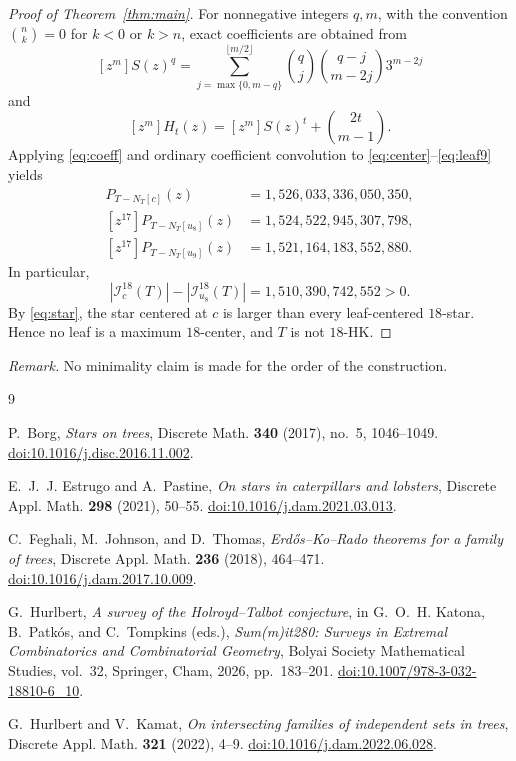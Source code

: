 \documentclass[11pt]{amsart}
\newcommand{\I}{\mathcal I}
\begin{document}
\begin{proof}[Proof of Theorem~\ref{thm:main}]
For nonnegative integers $q,m$, with the convention $\binom{n}{k}=0$ for
$k<0$ or $k>n$, exact coefficients are obtained from
\begin{equation}\label{eq:coeff}
[z^m]S(z)^q
=
\sum_{j=\max\{0,m-q\}}^{\lfloor m/2\rfloor}
\binom{q}{j}\binom{q-j}{m-2j}3^{m-2j}
\end{equation}
and
\[
[z^m]H_t(z)=[z^m]S(z)^t+\binom{2t}{m-1}.
\]
Applying \eqref{eq:coeff} and ordinary coefficient convolution to
\eqref{eq:center}--\eqref{eq:leaf9} yields
\begin{align*}
[z^{17}]P_{T-N_T[c]}(z)
  &=1{,}526{,}033{,}336{,}050{,}350,\\
[z^{17}]P_{T-N_T[u_8]}(z)
  &=1{,}524{,}522{,}945{,}307{,}798,\\
[z^{17}]P_{T-N_T[u_9]}(z)
  &=1{,}521{,}164{,}183{,}552{,}880.
\end{align*}
In particular,
\[
|\I_c^{18}(T)|-|\I_{u_8}^{18}(T)|
=1{,}510{,}390{,}742{,}552>0.
\]
By \eqref{eq:star}, the star centered at $c$ is larger than every
leaf-centered $18$-star. Hence no leaf is a maximum $18$-center, and $T$ is
not $18$-HK.
\end{proof}

\medskip
\noindent\emph{Remark.} No minimality claim is made for the order of the
construction.

\begin{thebibliography}{9}

P.~Borg,
\emph{Stars on trees},
Discrete Math. \textbf{340} (2017), no.~5, 1046--1049.
\href{https://doi.org/10.1016/j.disc.2016.11.002}
{doi:10.1016/j.disc.2016.11.002}.

E.~J.~J. Estrugo and A.~Pastine,
\emph{On stars in caterpillars and lobsters},
Discrete Appl. Math. \textbf{298} (2021), 50--55.
\href{https://doi.org/10.1016/j.dam.2021.03.013}
{doi:10.1016/j.dam.2021.03.013}.

C.~Feghali, M.~Johnson, and D.~Thomas,
\emph{Erd\H{o}s--Ko--Rado theorems for a family of trees},
Discrete Appl. Math. \textbf{236} (2018), 464--471.
\href{https://doi.org/10.1016/j.dam.2017.10.009}
{doi:10.1016/j.dam.2017.10.009}.

G.~Hurlbert,
\emph{A survey of the Holroyd--Talbot conjecture},
in G.~O.~H. Katona, B.~Patk\'os, and C.~Tompkins (eds.),
\emph{Sum(m)it280: Surveys in Extremal Combinatorics and Combinatorial
Geometry}, Bolyai Society Mathematical Studies, vol.~32,
Springer, Cham, 2026, pp.~183--201.
\href{https://doi.org/10.1007/978-3-032-18810-6_10}
{doi:10.1007/978-3-032-18810-6\_10}.

G.~Hurlbert and V.~Kamat,
\emph{On intersecting families of independent sets in trees},
Discrete Appl. Math. \textbf{321} (2022), 4--9.
\href{https://doi.org/10.1016/j.dam.2022.06.028}
{doi:10.1016/j.dam.2022.06.028}.

\end{thebibliography}
\end{document}
